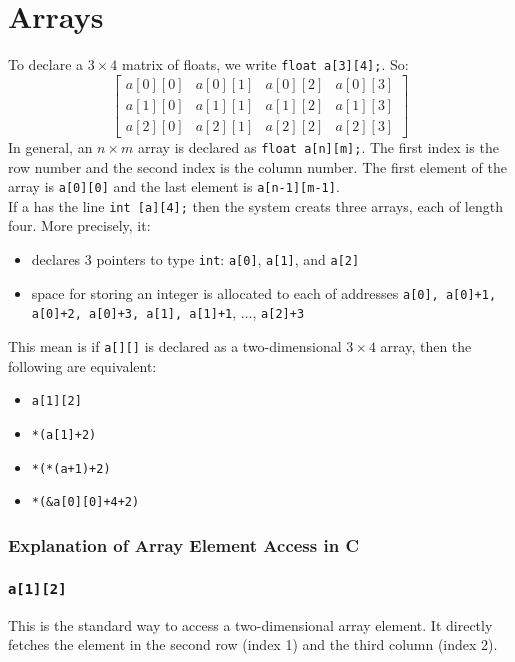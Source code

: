 \documentclass[a4paper, 10pt]{article}
\begin{document}
\section{Arrays}
To declare a $3 \times 4$ matrix of floats, we write \texttt{float a[3][4];}. So:
$$\begin{bmatrix}
        a[0][0] & a[0][1] & a[0][2] & a[0][3] \\
        a[1][0] & a[1][1] & a[1][2] & a[1][3] \\
        a[2][0] & a[2][1] & a[2][2] & a[2][3]
    \end{bmatrix}
$$
In general, an $n \times m$ array is declared as \texttt{float a[n][m];}. The first index is the row number and the second index is the column number. The first element of the array is \texttt{a[0][0]} and the last element is \texttt{a[n-1][m-1]}. \\[2ex]
If a has the line \texttt{int [a][4];} then the system creats three arrays, each of length four. More precisely, it:
\begin{itemize}
    \item declares 3 pointers to type \texttt{int}: \texttt{a[0]}, \texttt{a[1]}, and \texttt{a[2]}
    \item space for storing an integer is allocated to each of addresses \texttt{a[0], a[0]+1, a[0]+2, a[0]+3, a[1], a[1]+1}, $\dots$, \texttt{a[2]+3}
\end{itemize}
This mean is if \texttt{a[][]} is declared as a two-dimensional $3 \times 4$ array, then the following are equivalent:
\begin{itemize}
    \item \texttt{a[1][2]}
    \item \texttt{*(a[1]+2)}
    \item \texttt{*(*(a+1)+2)}
    \item \texttt{*(\&a[0][0]+4+2)}
\end{itemize}
\subsubsection*{Explanation of Array Element Access in C}

\subsubsection*{\texttt{a[1][2]}}
This is the standard way to access a two-dimensional array element. It directly fetches the element in the second row (index 1) and the third column (index 2).
\end{document}
